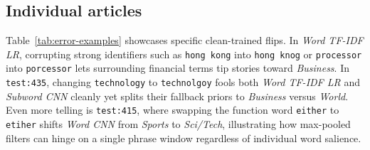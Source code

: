 

\newpage
\subsection{Individual articles}
Table~\ref{tab:error-examples} showcases specific clean-trained flips. In \textit{Word TF-IDF LR}, corrupting strong identifiers such as \texttt{hong kong} into \texttt{hong knog} or \texttt{processor} into \texttt{porcessor} lets surrounding financial terms tip stories toward \emph{Business}. In \texttt{test:435}, changing \texttt{technology} to \texttt{technolgoy} fools both \textit{Word TF-IDF LR} and \textit{Subword CNN} cleanly yet splits their fallback priors to \emph{Business} versus \emph{World}. Even more telling is \texttt{test:415}, where swapping the function word \texttt{either} to \texttt{etiher} shifts \textit{Word CNN} from \emph{Sports} to \emph{Sci/Tech}, illustrating how max-pooled filters can hinge on a single phrase window regardless of individual word salience.

